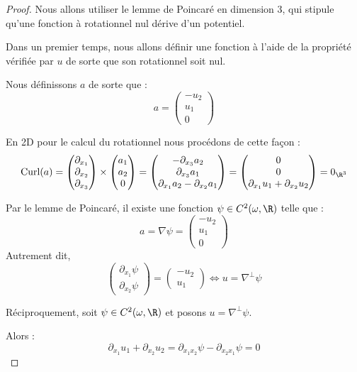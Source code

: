 \begin{proof}

    \vspace{1em}

    Nous allons utiliser le lemme de Poincaré en dimension 3, qui stipule qu'une fonction à rotationnel nul dérive d'un potentiel.
    
    \vspace{1em}
    
    Dans un premier temps, nous allons définir une fonction à l'aide de la propriété vérifiée par $u$ de sorte que son rotationnel soit nul.

    Nous définissons $a$ de sorte que :
    $$ a = \begin{pmatrix}
        -u_2 \\
        u_1 \\
        0
    \end{pmatrix} $$

    En 2D pour le calcul du rotationnel nous procédons de cette façon :
    $$\text{Curl}(a) = \begin{pmatrix}
        \partial_{x_1} \\
        \partial_{x_2} \\
        \partial_{x_3}
    \end{pmatrix} \times 
    \begin{pmatrix}
        a_1 \\
        a_2 \\
        0
    \end{pmatrix} = \begin{pmatrix}
        -\partial_{x_3}a_2 \\
        \partial_{x_3}a_1 \\
        \partial_{x_1} a_2 - \partial_{x_2} a_1
    \end{pmatrix} = 
    \begin{pmatrix}
        0 \\
        0 \\
        \partial_{x_1} u_1 + \partial_{x_2} u_2
    \end{pmatrix} = 0_{\R^3} $$

    Par le lemme de Poincaré, il existe une fonction $\psi \in C^2(\omega,\R)$ telle que :
    $$ a = \nabla \psi = \begin{pmatrix}
        - u_2 \\
        u_1 \\
        0
    \end{pmatrix} $$   
    Autrement dit, 
    $$ \begin{pmatrix}
        \partial_{x_1} \psi \\
        \partial_{x_2} \psi 
    \end{pmatrix} =
    \begin{pmatrix}
        -u_2 \\
        u_1
    \end{pmatrix} \Leftrightarrow 
    u = \nabla^{\perp} \psi  $$

    \vspace{1em}

    Réciproquement, soit $\psi \in C^2(\omega,\R)$ et posons $u = \nabla^{\perp} \psi$.

    Alors :
    $$ \partial_{x_1} u_1 + \partial_{x_2} u_2 = \partial_{x_1 x_2} \psi - \partial_{x_2 x_1} \psi = 0 $$

\end{proof}